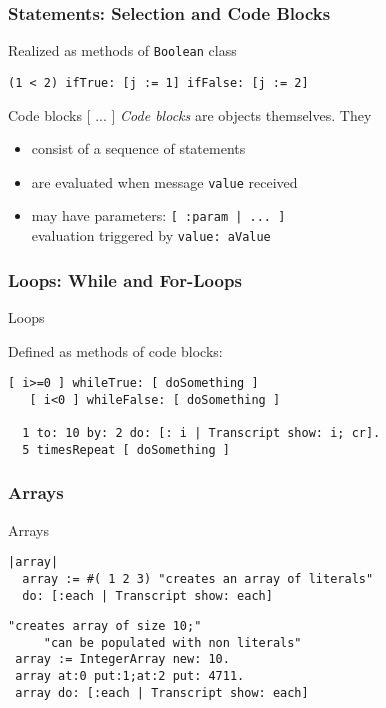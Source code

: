 \documentclass{beamer}
\newcommand{\Blue}[1]{\color{blue}#1\color{black}}
\begin{document}

\begin{frame}[fragile]
\frametitle{Statements: Selection and Code Blocks}

Realized as methods of \texttt{Boolean} class

\begin{lstlisting}[language=Smalltalk]
  (1 < 2) ifTrue: [j := 1] ifFalse: [j := 2]
\end{lstlisting} 

\pause\medskip

\begin{block}{Code blocks [ ... ]}
\emph{Code blocks} are objects themselves. They
\begin{itemize}
  \item consist of a sequence of statements
  \item are evaluated when message \texttt{value} received
  \item may have parameters: 
    \lstinline[language=Smalltalk]{[ :param | ... ]} \\
    evaluation triggered by \texttt{value: aValue}
\end{itemize}

\end{block}


\end{frame}


\begin{frame}[fragile]
\frametitle{Loops: While and For-Loops}

\Blue{Loops}\medskip

Defined as methods of code blocks:

\begin{lstlisting}[language=Smalltalk]
   [ i>=0 ] whileTrue: [ doSomething ]
   [ i<0 ] whileFalse: [ doSomething ]

  1 to: 10 by: 2 do: [: i | Transcript show: i; cr].
  5 timesRepeat [ doSomething ]   
\end{lstlisting} 

\end{frame}


\begin{frame}[fragile]
\frametitle{Arrays}

\Blue{Arrays}\medskip

\begin{lstlisting}[language=Smalltalk]
|array| 
  array := #( 1 2 3) "creates an array of literals"
  do: [:each | Transcript show: each] 
\end{lstlisting} 



\begin{lstlisting}[language=Smalltalk]
 "creates array of size 10;"
     "can be populated with non literals"
 array := IntegerArray new: 10. 
 array at:0 put:1;at:2 put: 4711.
 array do: [:each | Transcript show: each] 
  
\end{lstlisting} 

\end{frame}
\end{document}
